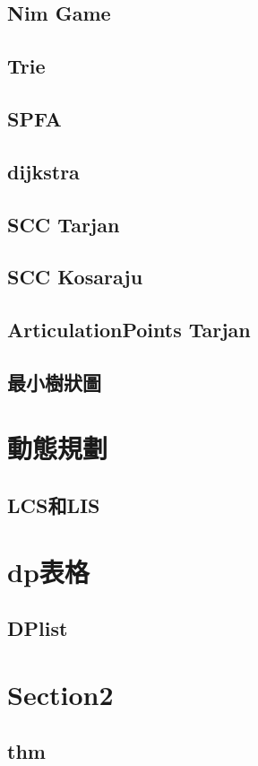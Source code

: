     \subsection{Nim Game}
        
    \subsection{Trie}
        
    \subsection{SPFA}
        
    \subsection{dijkstra}
        
    \subsection{SCC Tarjan}
        
    \subsection{SCC Kosaraju}
        
    \subsection{ArticulationPoints Tarjan}
        
    \subsection{最小樹狀圖}
        
        
\section{動態規劃}
    \subsection{LCS和LIS}
        

\section{dp表格}
    \subsection{DPlist}
        
    
    



\section{Section2}
    \subsection{thm}
        
